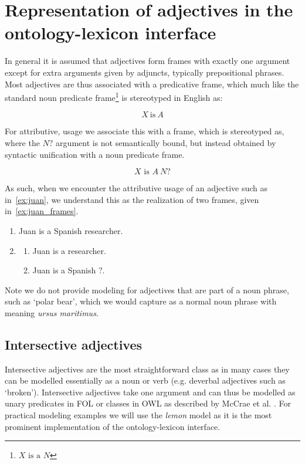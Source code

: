 \documentclass[11pt]{article}
\begin{document}
\section{Representation of adjectives in the ontology-lexicon interface}

In general it is assumed that adjectives form frames with exactly one argument 
except for extra arguments given by adjuncts, typically prepositional phrases. 
Most adjectives are thus associated with a predicative frame, which much
like the standard noun predicate frame\footnote{$X\text{ is a }N$} is stereotyped in English as:

$$X\mathrm{~is~}A$$

For attributive, usage we associate this with a frame, which is stereotyped as,
where the $N?$ argument is not semantically bound, but instead obtained by
syntactic unification with a noun predicate frame.

$$X\text{ is }A~N?$$

As such, when we encounter the attributive usage of an adjective such as in~\ref{ex:juan}, 
we understand this as the realization of two frames, given in~\ref{ex:juan_frames}.

\begin{enumerate}[resume]
\item Juan is a Spanish researcher. \label{ex:juan}
\item \begin{enumerate}
\item Juan is a researcher.
\item Juan is a Spanish $?$.
\end{enumerate}
\label{ex:juan_frames}
\end{enumerate}

Note we do not provide modeling for adjectives that are part of a noun phrase,
such as `polar bear', which we would capture as a normal noun phrase with 
meaning \emph{ursus maritimus}.

\subsection{Intersective adjectives} \label{sec:intersectives}

Intersective adjectives are the most straightforward class as in many cases they 
can be modelled essentially as a noun or verb (e.g. deverbal adjectives such as `broken'). Intersective 
adjectives take one argument and can thus be modelled as unary predicates in FOL or classes in OWL as described by McCrae et al. \cite{mccrae2014design}. For practical modeling examples we will use the
\emph{lemon} model as it is the most prominent implementation of the 
ontology-lexicon interface.
\end{document}
